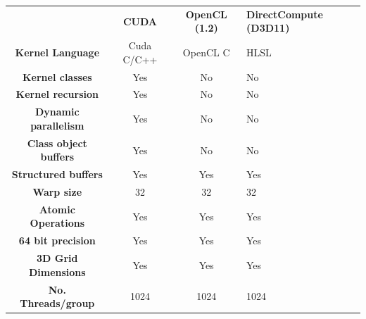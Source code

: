 \begin{table}[H]

    \begin{tabularx}{\textwidth}{ |c|c|c|X| }
        \hline
        \rowcolor{gray}
        \multicolumn{4}{|c|}{\textbf{Features}}\\ \hline
      
                                            & \textbf{CUDA}                      & \textbf{OpenCL (1.2)}        & \textbf{DirectCompute (D3D11)}    \\ \hline
        \textbf{Kernel Language}            & \cellcolor{green}Cuda C/C++        & \cellcolor{green}OpenCL C    & \cellcolor{green}HLSL             \\ \hline
        \textbf{Kernel classes}             & \cellcolor{green}Yes               & \cellcolor{red}No            & \cellcolor{red}No                 \\ \hline
        \textbf{Kernel recursion}           & \cellcolor{green}Yes               & \cellcolor{red}No            & \cellcolor{red}No                 \\ \hline
        \textbf{Dynamic parallelism}        & \cellcolor{green}Yes               & \cellcolor{red}No            & \cellcolor{red}No                 \\ \hline
        \hline
        \textbf{Class object buffers}       & \cellcolor{green}Yes               & \cellcolor{red}No            & \cellcolor{red}No                 \\ \hline
        \textbf{Structured buffers}         & \cellcolor{green}Yes               & \cellcolor{green}Yes         & \cellcolor{green}Yes              \\ \hline
        \hline
        \textbf{Warp size}                  & \cellcolor{green}32                & \cellcolor{green}32          & \cellcolor{green}32               \\ \hline
        \textbf{Atomic Operations}          & \cellcolor{green}Yes               & \cellcolor{green}Yes         & \cellcolor{green}Yes              \\ \hline
        \textbf{64 bit precision}           & \cellcolor{green}Yes               & \cellcolor{green}Yes         & \cellcolor{green}Yes              \\ \hline
        \textbf{3D Grid Dimensions}         & \cellcolor{green}Yes               & \cellcolor{green}Yes         & \cellcolor{green}Yes              \\ \hline
        \textbf{No. Threads/group}          & \cellcolor{green}1024              & \cellcolor{green}1024        & \cellcolor{green}1024             \\ \hline 

\end{tabularx}
\end{table}
